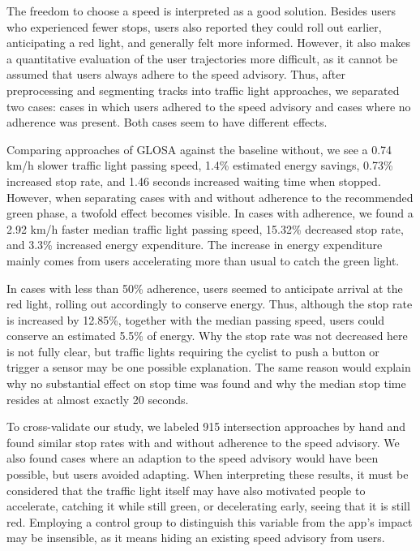 \begin{Summary}
The freedom to choose a speed is interpreted as a good solution. Besides users who experienced fewer stops, users also reported they could roll out earlier, anticipating a red light, and generally felt more informed. However, it also makes a quantitative evaluation of the user trajectories more difficult, as it cannot be assumed that users always adhere to the speed advisory. Thus, after preprocessing and segmenting tracks into traffic light approaches, we separated two cases: cases in which users adhered to the speed advisory and cases where no adherence was present. Both cases seem to have different effects.

Comparing approaches of GLOSA against the baseline without, we see a 0.74 km/h slower traffic light passing speed, 1.4\% estimated energy savings, 0.73\% increased stop rate, and 1.46 seconds increased waiting time when stopped. However, when separating cases with and without adherence to the recommended green phase, a twofold effect becomes visible. In cases with adherence, we found a 2.92 km/h faster median traffic light passing speed, 15.32\% decreased stop rate, and 3.3\% increased energy expenditure. The increase in energy expenditure mainly comes from users accelerating more than usual to catch the green light. 

In cases with less than 50\% adherence, users seemed to anticipate arrival at the red light, rolling out accordingly to conserve energy. Thus, although the stop rate is increased by 12.85\%, together with the median passing speed, users could conserve an estimated 5.5\% of energy. Why the stop rate was not decreased here is not fully clear, but traffic lights requiring the cyclist to push a button or trigger a sensor may be one possible explanation. The same reason would explain why no substantial effect on stop time was found and why the median stop time resides at almost exactly 20 seconds. 

To cross-validate our study, we labeled 915 intersection approaches by hand and found similar stop rates with and without adherence to the speed advisory. We also found cases where an adaption to the speed advisory would have been possible, but users avoided adapting. When interpreting these results, it must be considered that the traffic light itself may have also motivated people to accelerate, catching it while still green, or decelerating early, seeing that it is still red. Employing a control group to distinguish this variable from the app's impact may be insensible, as it means hiding an existing speed advisory from users.
\end{Summary}

